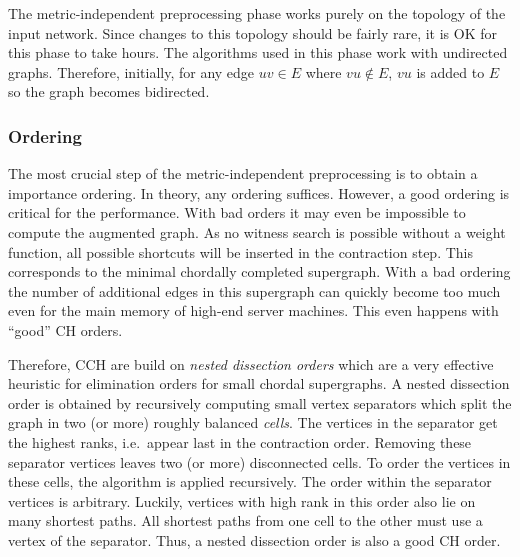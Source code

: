 \documentclass[a4paper, english, cleveref]{lipics-v2021}
\begin{document}
The metric-independent preprocessing phase works purely on the topology of the input network.
Since changes to this topology should be fairly rare, it is OK for this phase to take hours.
The algorithms used in this phase work with undirected graphs.
Therefore, initially, for any edge $uv \in E$ where $vu \notin E$, $vu$ is added to $E$ so the graph becomes bidirected.

\subsubsection{Ordering}

The most crucial step of the metric-independent preprocessing is to obtain a importance ordering.
In theory, any ordering suffices.
However, a good ordering is critical for the performance.
With bad orders it may even be impossible to compute the augmented graph.
As no witness search is possible without a weight function, all possible shortcuts will be inserted in the contraction step.
This corresponds to the minimal chordally completed supergraph.
With a bad ordering the number of additional edges in this supergraph can quickly become too much even for the main memory of high-end server machines.
This even happens with ``good'' CH orders.

Therefore, CCH are build on \emph{nested dissection orders} which are a very effective heuristic for elimination orders for small chordal supergraphs.
A nested dissection order is obtained by recursively computing small vertex separators which split the graph in two (or more) roughly balanced \emph{cells}.
The vertices in the separator get the highest ranks, i.e.\ appear last in the contraction order.
Removing these separator vertices leaves two (or more) disconnected cells.
To order the vertices in these cells, the algorithm is applied recursively.
The order within the separator vertices is arbitrary.
Luckily, vertices with high rank in this order also lie on many shortest paths.
All shortest paths from one cell to the other must use a vertex of the separator.
Thus, a nested dissection order is also a good CH order.
\end{document}
